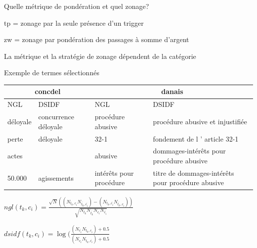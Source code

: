 \documentclass[newPxFont,pagenumber]{beamer}
\begin{document}
\begin{frame}{Quelle métrique de pondération et quel zonage?}
\begin{table}[]
\begin{flushleft}
tp = zonage par la seule présence d'un trigger

zw = zonage par pondération des passages à somme d'argent
\end{flushleft}

\end{table}

La métrique et la stratégie de zonage dépendent de la catégorie

\end{frame}

\begin{frame}{Exemple de termes sélectionnés}
\scriptsize
\begin{table}
\begin{tabular}{ll|lp{}}
 \multicolumn{2}{c|}{concdel} &  \multicolumn{2}{c}{danais} \\ \hline \noalign{\smallskip}
 NGL & DSIDF & NGL & DSIDF \\ \hline
déloyale & concurrence déloyale & procédure abusive       & procédure abusive et injustifiée                  \\ \hline
perte    & déloyale             & 32-1                    & fondement de l ' article 32-1                     \\ \hline
actes    &                      & abusive                 & dommages-intérêts pour procédure abusive          \\ \hline
50.000   & agissements          & intérêts pour procédure & titre de dommages-intérêts pour procédure abusive
\end{tabular}
\end{table}

$ngl(t_k,c_i) = \frac{\sqrt{N} ((N_{t_k,c_i} N_{\overline{t_k},\overline{c_i}}) - (N_{t_k,\overline{c_i}} N_{\overline{t_k},c_i}))}{\sqrt{N_{t_k} N_{\overline{t_k}} N_{c_i} N_{\overline{c_i}}}}$

$dsidf(t_k, c_i)=\log (\frac{(N_{\overline{c_i}}N_{t_k,c_i}) + 0.5}{(N_{c_i}N_{t_k,\overline{c_i}}) + 0.5} $
\end{frame}
\end{document}
